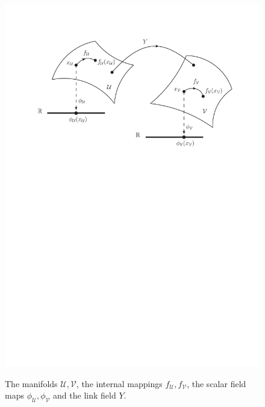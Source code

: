 \begin{figure}[!t]
      \begin{center}
{\includegraphics[scale=0.7]{images/mapping1}}
      \end{center}
\caption{The manifolds $\mathcal{U, V}$, the internal mappings $f_{\mathcal{U}}, f_{\mathcal{V}}$, the scalar field maps $\phi_{\mathcal{U}}, \phi_{\mathcal{V}}$ and the link field $Y$.} \label{fig:mapping1}
\end{figure}

